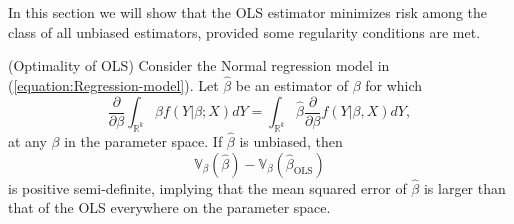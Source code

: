 \documentclass[11pt]{article} %
\begin{document}
In this section we will show that the OLS estimator minimizes risk among the class of all unbiased estimators, provided some regularity conditions are met. 

\begin{proposition}(Optimality of OLS) Consider the Normal regression model in (\ref{equation:Regression-model}). Let $\widehat{\beta}$ be an estimator of $\beta$ for which
\[ \frac{\partial}{\partial \beta} \int_{\mathbb{R}^{k}} \widehat{\beta} f(Y | \beta; X ) dY = \int_{\mathbb{R}^{k}} \widehat{\beta} \frac{\partial}{\partial \beta} f(Y | \beta , X) dY,   \]
at any $\beta$ in the parameter space. If $\widehat{\beta}$ is unbiased, then
\[ \mathbb{V}_{\beta} ( \widehat{\beta} ) - \mathbb{V}_{\beta} (\widehat{\beta}_{\textrm{OLS}})  \]
is positive semi-definite, implying that the mean squared error of $\widehat{\beta}$ is larger than that of the OLS everywhere on the parameter space. 
\end{proposition}
 
\end{document}
